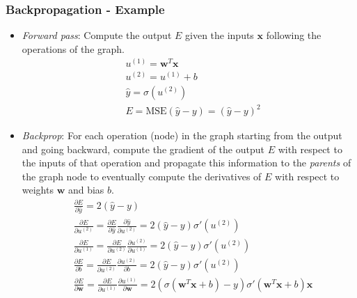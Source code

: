 \documentclass{beamer}
\begin{document}
	\begin{frame}
		\frametitle{Backpropagation - Example}
		\tiny
		\begin{itemize}
			\item \textit{Forward pass}: Compute the output $E$ given the inputs $\bm{x}$ following the operations of the graph.
			\begin{align*}
				&u^{(1)} = \bm{w}^T\bm{x} \\
				&u^{(2)} = u^{(1)} + b \\
				&\hat{y} = \sigma(u^{(2)}) \\
				&E = \textrm{MSE}(\hat{y}-y) = (\hat{y}-y)^2
			\end{align*}
			\item \textit{Backprop}:
			For each operation (node) in the graph starting from the output and going backward, compute the gradient of the output $E$ with respect to the inputs of that operation and propagate this information to the \textit{parents} of the graph node to eventually compute the derivatives of $E$ with respect to weights $\bm{w}$ and bias $b$.
			\begin{align*}
				&\frac{\partial E}{\partial \hat{y}} = 2(\hat{y}-y) \\
				&\frac{\partial E}{\partial u^{(2)}} = \frac{\partial E}{\partial \hat{y}} \frac{\partial \hat{y}}{\partial u^{(2)}} = 2(\hat{y}-y) \sigma'(u^{(2)})\\
				&\frac{\partial E}{\partial u^{(1)}} = \frac{\partial E}{\partial u^{(2)}}  \frac{\partial u^{(2)}}{\partial u^{(1)}}  = 2(\hat{y}-y) \sigma'(u^{(2)})  \\
				&\frac{\partial E}{\partial b}  = \frac{\partial E}{\partial u^{(2)}}  \frac{\partial u^{(2)}}{\partial b}  = 2(\hat{y}-y) \sigma'(u^{(2)})\\
				&\frac{\partial E}{\partial \bm{w}}  =\frac{\partial E}{\partial u^{(1)}} \frac{\partial u^{(1)}}{\partial \bm{w}}= 2( \sigma( \bm{w}^T\bm{x} +b)-y) \sigma'( \bm{w}^T\bm{x} +b) \bm{x}
			\end{align*}
		\end{itemize}
		
	\end{frame}

\end{document}
